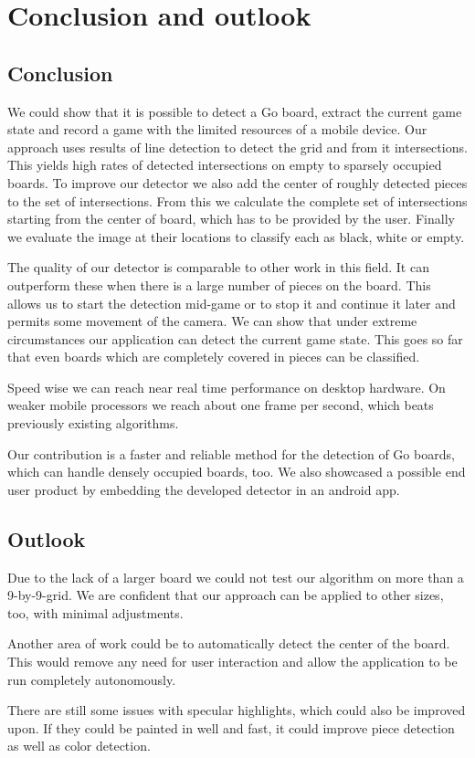 
\chapter{Conclusion and outlook}
\section{Conclusion}
We could show that it is possible to detect a Go board, extract the current game state and record a game with the limited resources of a mobile device. Our approach uses results of line detection to detect the grid and from it intersections. This yields high rates of detected intersections on empty to sparsely occupied boards. To improve our detector we also add the center of roughly detected pieces to the set of intersections. From this we calculate the complete set of intersections starting from the center of board, which has to be provided by the user. Finally we evaluate the image at their locations to classify each as black, white or empty.

The quality of our detector is comparable to other work in this field. It can outperform these when there is a large number of pieces on the board. This allows us to start the detection mid-game or to stop it and continue it later and permits some movement of the camera. We can show that under extreme circumstances our application can detect the current game state. This goes so far that even boards which are completely covered in pieces can be classified.

Speed wise we can reach near real time performance on desktop hardware. On weaker mobile processors we reach about one frame per second, which beats previously existing algorithms.

Our contribution is a faster and reliable method for the detection of Go boards, which can handle densely occupied boards, too. We also showcased a possible end user product by embedding the developed detector in an android app.

\section{Outlook}
Due to the lack of a larger board we could not test our algorithm on more than a 9-by-9-grid. We are confident that our approach can be applied to other sizes, too, with minimal adjustments.

Another area of work could be to automatically detect the center of the board. This would remove any need for user interaction and allow the application to be run completely autonomously.

There are still some issues with specular highlights, which could also be improved upon. If they could be painted in well and fast, it could improve piece detection as well as color detection.
